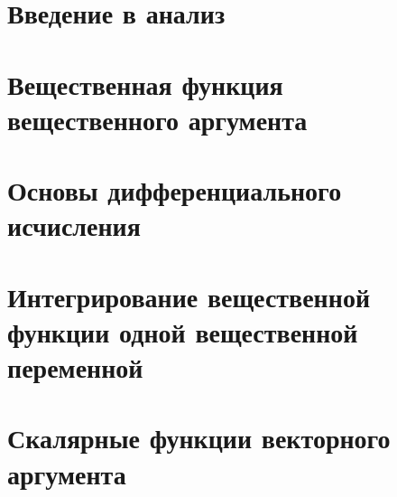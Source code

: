 
\LARGE


\tableofcontents %
\LARGE

\chapter{Введение в анализ}

\chapter{Вещественная функция вещественного аргумента}

\chapter{Основы дифференциального исчисления}

\chapter{Интегрирование вещественной функции одной вещественной переменной}

\chapter{Скалярные функции векторного аргумента}


